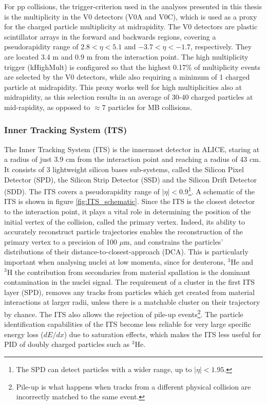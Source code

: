 For pp collisions, the trigger-criterion used in the analyses presented in this thesis is the multiplicity in the V0 detectors (V0A and V0C), which is used as a proxy for the charged particle multiplicity at midrapidity. The V0 detectors are plastic scintillator arrays in the forward and backwards regions, covering a pseudorapidity range of $2.8<\eta<5.1$ and $-3.7<\eta<-1.7$, respectively. They are located 3.4 m and 0.9 m from the interaction point. The high multiplicity trigger (kHighMult) is configured so that the highest 0.17\% of multiplicity events are selected by the V0 detectors, while also requiring a minimum of 1 charged particle at midrapidity. This proxy works well for high multiplicities also at midrapidity, as this selection results in an average of 30-40 charged particles at mid-rapidity, as opposed to $\approx7$ particles for MB collisions. 

\subsubsection{Inner Tracking System (ITS)}
The Inner Tracking System (ITS) is the innermost detector in ALICE, staring at a radius of just 3.9 cm from the interaction point and reaching a radius of 43 cm. It consists of 3 lightweight silicon bases sub-systems, called the Silicon Pixel Detector (SPD), the Silicon Strip Detector (SSD) and the Silicon Drift Detector (SDD). The ITS covers a pseudorapidity range of $|\eta|<0.9$\footnote{The SPD can detect particles with a wider range, up to $|\eta|<1.95$.}. A schematic of the ITS is shown in figure \ref{fig:ITS_schematic}. Since the ITS is the closest detector to the interaction point, it plays a vital role in determining the position of the initial vertex of the collision, called the primary vertex. Indeed, its ability to accurately reconstruct particle trajectories enables the reconstruction of the primary vertex to a precision of 100 $\mu$m, and constrains the particles' distributions of their distance-to-closest-approach (DCA). This is particularly important when analysing nuclei at low momenta, since for deuterons, $^3\mathrm{He}$ and $^3\mathrm{H}$ the contribution from secondaries from material spallation is the dominant contamination in the nuclei signal. The requirement of a cluster in the first ITS layer (SPD), removes any tracks from particles which get created from material interactions at larger radii, unless there is a matchable cluster on their trajectory by chance. The ITS also allows the rejection of pile-up events\footnote{Pile-up is what happens when tracks from a different physical collision are incorrectly matched to the same event.}. The particle identification capabilities of the ITS become less reliable for very large specific energy loss ($dE/dx$) due to saturation effects, which makes the ITS less useful for PID of doubly charged particles such as $^3\mathrm{He}$.

